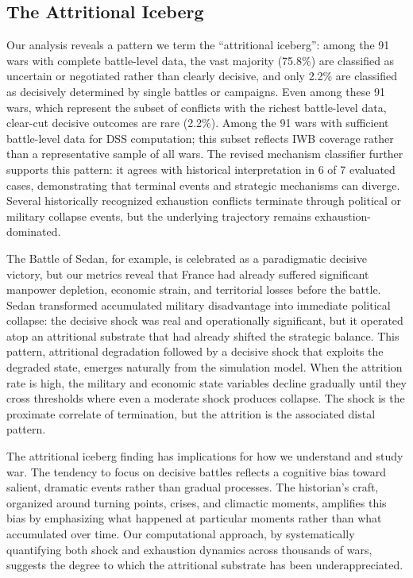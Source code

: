 \subsection{The Attritional Iceberg}

Our analysis reveals a pattern we term the ``attritional iceberg'': among the 91 wars with complete battle-level data, the vast majority (75.8\%) are classified as uncertain or negotiated rather than clearly decisive, and only 2.2\% are classified as decisively determined by single battles or campaigns. Even among these 91 wars, which represent the subset of conflicts with the richest battle-level data, clear-cut decisive outcomes are rare (2.2\%). Among the 91 wars with sufficient battle-level data for DSS computation; this subset reflects IWB coverage rather than a representative sample of all wars. The revised mechanism classifier further supports this pattern: it agrees with historical interpretation in 6 of 7 evaluated cases, demonstrating that terminal events and strategic mechanisms can diverge. Several historically recognized exhaustion conflicts terminate through political or military collapse events, but the underlying trajectory remains exhaustion-dominated.

The Battle of Sedan, for example, is celebrated as a paradigmatic decisive victory, but our metrics reveal that France had already suffered significant manpower depletion, economic strain, and territorial losses before the battle. Sedan transformed accumulated military disadvantage into immediate political collapse: the decisive shock was real and operationally significant, but it operated atop an attritional substrate that had already shifted the strategic balance. This pattern, attritional degradation followed by a decisive shock that exploits the degraded state, emerges naturally from the simulation model. When the attrition rate is high, the military and economic state variables decline gradually until they cross thresholds where even a moderate shock produces collapse. The shock is the proximate correlate of termination, but the attrition is the associated distal pattern.

The attritional iceberg finding has implications for how we understand and study war. The tendency to focus on decisive battles reflects a cognitive bias toward salient, dramatic events rather than gradual processes. The historian's craft, organized around turning points, crises, and climactic moments, amplifies this bias by emphasizing what happened at particular moments rather than what accumulated over time. Our computational approach, by systematically quantifying both shock and exhaustion dynamics across thousands of wars, suggests the degree to which the attritional substrate has been underappreciated.

